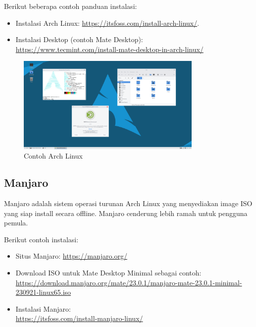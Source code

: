 \documentclass[12pt]{book}
\begin{document}
	Berikut beberapa contoh panduan instalasi:
	
	\begin{itemize}
		\item Instalasi Arch Linux: \url{https://itsfoss.com/install-arch-linux/}.
		
		\item Instalasi Desktop (contoh Mate Desktop): \\
		\url{https://www.tecmint.com/install-mate-desktop-in-arch-linux/}
	\end{itemize}
	
	\begin{figure}[!ht]
		\centering
		\includegraphics[width=0.8\textwidth]{images/os/archmate}
		\caption{Contoh Arch Linux}
	\end{figure}
	
	\newpage
	\subsection{Manjaro}
	
	Manjaro adalah sistem operasi turunan Arch Linux yang menyediakan image ISO yang siap install secara offline.
	Manjaro cenderung lebih ramah untuk pengguna pemula.
	
	Berikut contoh instalasi:
	
	\begin{itemize}
		\item Situs Manjaro: \url{https://manjaro.org/}
		
		\item Download ISO untuk Mate Desktop Minimal sebagai contoh: \\
		\url{https://download.manjaro.org/mate/23.0.1/manjaro-mate-23.0.1-minimal-230921-linux65.iso}
		
		\item Instalasi Manjaro: \\
		\url{https://itsfoss.com/install-manjaro-linux/}
	\end{itemize}
	
\end{document}
